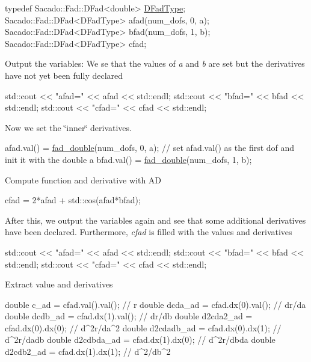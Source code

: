 \begin{DoxyCode}
\textcolor{keyword}{typedef} Sacado::Fad::DFad<double> \hyperlink{Sacado__Wrapper_8h_a7e0893207b87dad05c66a34baac8ed2e}{DFadType};
Sacado::Fad::DFad<DFadType> afad(num\_dofs, 0, a);
Sacado::Fad::DFad<DFadType> bfad(num\_dofs, 1, b);
Sacado::Fad::DFad<DFadType> cfad;
\end{DoxyCode}
 Output the variables\+: We se that the values of {\itshape a} and {\itshape b} are set but the derivatives have not yet been fully declared 
\begin{DoxyCode}
std::cout << \textcolor{stringliteral}{"afad="} << afad << std::endl;
std::cout << \textcolor{stringliteral}{"bfad="} << bfad << std::endl;
std::cout << \textcolor{stringliteral}{"cfad="} << cfad << std::endl;
\end{DoxyCode}
 Now we set the \char`\"{}inner\char`\"{} derivatives. 
\begin{DoxyCode}
afad.val() = \hyperlink{Sacado__example_8cc_a868b94676739e612d9c95940e70892a9}{fad\_double}(num\_dofs, 0, a); \textcolor{comment}{// set afad.val() as the first dof and init it with the
       double a}
bfad.val() = \hyperlink{Sacado__example_8cc_a868b94676739e612d9c95940e70892a9}{fad\_double}(num\_dofs, 1, b);
\end{DoxyCode}
 Compute function and derivative with AD 
\begin{DoxyCode}
cfad = 2*afad + std::cos(afad*bfad);
\end{DoxyCode}
 After this, we output the variables again and see that some additional derivatives have been declared. Furthermore, {\itshape cfad} is filled with the values and derivatives 
\begin{DoxyCode}
std::cout << \textcolor{stringliteral}{"afad="} << afad << std::endl;
std::cout << \textcolor{stringliteral}{"bfad="} << bfad << std::endl;
std::cout << \textcolor{stringliteral}{"cfad="} << cfad << std::endl;
\end{DoxyCode}
 Extract value and derivatives 
\begin{DoxyCode}
\textcolor{keywordtype}{double} c\_ad = cfad.val().val();       \textcolor{comment}{// r}
\textcolor{keywordtype}{double} dcda\_ad = cfad.dx(0).val();    \textcolor{comment}{// dr/da}
\textcolor{keywordtype}{double} dcdb\_ad = cfad.dx(1).val();    \textcolor{comment}{// dr/db}
\textcolor{keywordtype}{double} d2cda2\_ad = cfad.dx(0).dx(0);  \textcolor{comment}{// d^2r/da^2}
\textcolor{keywordtype}{double} d2cdadb\_ad = cfad.dx(0).dx(1); \textcolor{comment}{// d^2r/dadb}
\textcolor{keywordtype}{double} d2cdbda\_ad = cfad.dx(1).dx(0); \textcolor{comment}{// d^2r/dbda}
\textcolor{keywordtype}{double} d2cdb2\_ad = cfad.dx(1).dx(1);  \textcolor{comment}{// d^2/db^2}
\end{DoxyCode}
